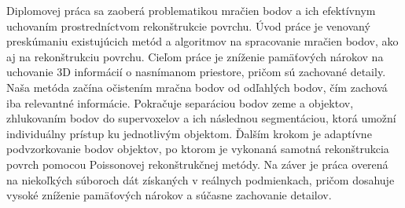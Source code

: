 Diplomovej práca sa zaoberá problematikou mračien bodov a ich efektívnym uchovaním prostredníctvom rekonštrukcie povrchu. Úvod práce je venovaný preskúmaniu existujúcich metód a algoritmov na spracovanie mračien bodov, ako aj na rekonštrukciu povrchu. Cieľom práce je zníženie pamäťových nárokov na uchovanie 3D informácií o nasnímanom priestore, pričom sú zachované detaily. Naša metóda začína očistením mračna bodov od odľahlých bodov, čím zachová iba relevantné informácie. Pokračuje separáciou bodov zeme a objektov, zhlukovaním bodov do supervoxelov a ich následnou segmentáciou, ktorá umožní individuálny prístup ku jednotlivým objektom. Ďalším krokom je adaptívne podvzorkovanie bodov objektov, po ktorom je vykonaná samotná rekonštrukcia povrch pomocou Poissonovej rekonštrukčnej metódy. Na záver je práca overená na niekoľkých súboroch dát získaných v reálnych podmienkach, pričom dosahuje vysoké zníženie pamäťových nárokov a súčasne zachovanie detailov. 